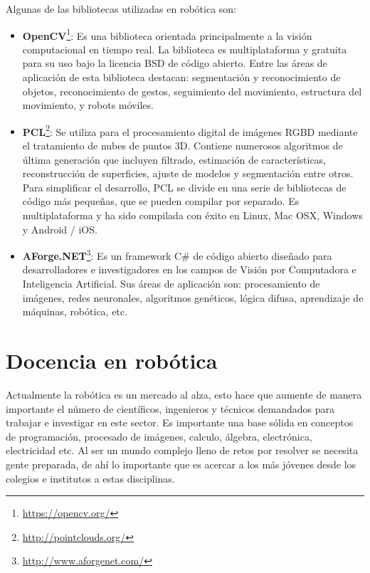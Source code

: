 Algunas de las bibliotecas utilizadas en robótica son:

\begin{itemize}
\item \textbf{OpenCV}\footnote{\url{https://opencv.org/}}: Es una biblioteca orientada principalmente a la visión computacional en tiempo real. La biblioteca es multiplataforma y gratuita para su uso bajo la licencia BSD de código abierto. Entre las áreas de aplicación de esta biblioteca destacan: segmentación y reconocimiento de objetos, reconocimiento de gestos, seguimiento del movimiento, estructura del movimiento,  y robots móviles.

\item \textbf{PCL}\footnote{\url{http://pointclouds.org/}}: Se utiliza para el procesamiento digital de imágenes RGBD mediante el tratamiento de nubes de puntos 3D. Contiene numerosos algoritmos de última generación que incluyen filtrado, estimación de características, reconstrucción de superficies, ajuste de modelos y segmentación entre otros. Para simplificar el desarrollo, PCL se divide en una serie de bibliotecas de código más pequeñas, que se pueden compilar por separado. Es multiplataforma y ha sido compilada con éxito en Linux, Mac OSX, Windows y Android / iOS.

\item \textbf{AForge.NET}\footnote{\url{http://www.aforgenet.com/}}: Es un framework C\# de código abierto diseñado para desarrolladores e investigadores en los campos de Visión por Computadora e Inteligencia Artificial. Sus áreas de aplicación son: procesamiento de imágenes, redes neuronales, algoritmos genéticos, lógica difusa, aprendizaje de máquinas, robótica, etc.
\end{itemize}

\section{Docencia en robótica}

Actualmente la robótica es un mercado al alza, esto hace que aumente de manera importante el número de científicos, ingenieros y técnicos demandados para trabajar e investigar en este sector.
Es importante una base sólida en conceptos de programación, procesado de imágenes, calculo, álgebra, electrónica, electricidad etc. Al ser un mundo complejo lleno de retos por resolver se necesita gente preparada, de ahí lo importante que es acercar a los más jóvenes desde los colegios e institutos a estas disciplinas.\\


